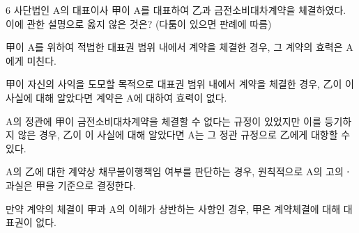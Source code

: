 \begin{question}{6}
사단법인 A의 대표이사 甲이 A를 대표하여 乙과 금전소비대차계약을 체결하였다. 이에 관한 설명으로 옳지 않은 것은? (다툼이 있으면 판례에 따름)
\begin{choices}
  \item 甲이 A를 위하여 적법한 대표권 범위 내에서 계약을 체결한 경우, 그 계약의 효력은 A에게 미친다.
  \item 甲이 자신의 사익을 도모할 목적으로 대표권 범위 내에서 계약을 체결한 경우, 乙이 이 사실에 대해 알았다면 계약은 A에 대하여 효력이 없다.
  \item A의 정관에 甲이 금전소비대차계약을 체결할 수 없다는 규정이 있었지만 이를 등기하지 않은 경우, 乙이 이 사실에 대해 알았다면 A는 그 정관 규정으로 乙에게 대항할 수 있다.
  \item A의 乙에 대한 계약상 채무불이행책임 여부를 판단하는 경우, 원칙적으로 A의 고의ㆍ과실은 甲을 기준으로 결정한다.
  \item 만약 계약의 체결이 甲과 A의 이해가 상반하는 사항인 경우, 甲은 계약체결에 대해 대표권이 없다.
\end{choices}
\end{question}
